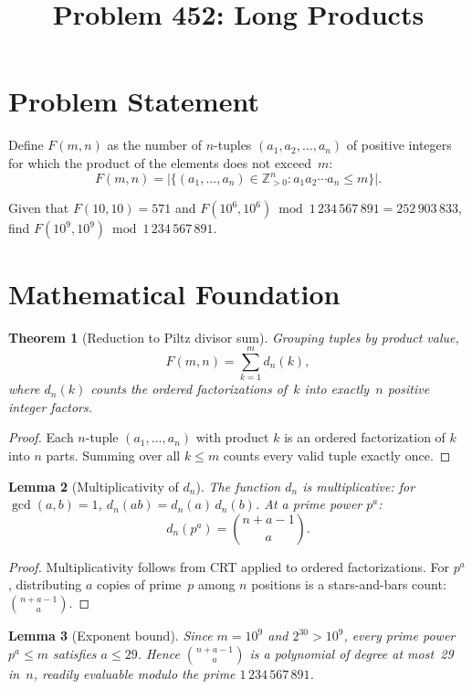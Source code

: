 \documentclass[12pt,a4paper]{article}
\title{Problem 452: Long Products}
\author{}
\date{}
\newtheorem{theorem}{Theorem}
\newtheorem{lemma}[theorem]{Lemma}
\newcommand{\Fmn}{F(m,n)}
\newcommand{\dn}{d_n}
\newcommand{\MOD}{1\,234\,567\,891}
\begin{document}
\maketitle

\section{Problem Statement}

Define $\Fmn$ as the number of $n$-tuples $(a_1, a_2, \ldots, a_n)$ of positive
integers for which the product of the elements does not exceed~$m$:
\[
  \Fmn = \bigl|\bigl\{(a_1, \ldots, a_n) \in \mathbb{Z}_{>0}^n : a_1 a_2 \cdots a_n \le m\bigr\}\bigr|.
\]

Given that $F(10, 10) = 571$ and $F(10^6, 10^6) \bmod \MOD = 252\,903\,833$,
find $F(10^9, 10^9) \bmod \MOD$.

\section{Mathematical Foundation}

\begin{theorem}[Reduction to Piltz divisor sum]\label{thm:piltz}
Grouping tuples by product value,
\[
  \Fmn = \sum_{k=1}^{m} \dn(k),
\]
where $\dn(k)$ counts the ordered factorizations of~$k$ into exactly~$n$ positive integer factors.
\end{theorem}

\begin{proof}
Each $n$-tuple $(a_1, \ldots, a_n)$ with product $k$ is an ordered factorization of $k$ into $n$ parts. Summing over all $k \le m$ counts every valid tuple exactly once.
\end{proof}

\begin{lemma}[Multiplicativity of $\dn$]\label{lem:mult}
The function $\dn$ is multiplicative: for $\gcd(a,b) = 1$,
$\dn(ab) = \dn(a)\,\dn(b)$. At a prime power $p^a$:
\[
  \dn(p^a) = \binom{n + a - 1}{a}.
\]
\end{lemma}

\begin{proof}
Multiplicativity follows from CRT applied to ordered factorizations. For $p^a$, distributing $a$ copies of prime~$p$ among $n$ positions is a stars-and-bars count: $\binom{n+a-1}{a}$.
\end{proof}

\begin{lemma}[Exponent bound]\label{lem:exp}
Since $m = 10^9$ and $2^{30} > 10^9$, every prime power $p^a \le m$ satisfies $a \le 29$. Hence $\binom{n+a-1}{a}$ is a polynomial of degree at most~29 in~$n$, readily evaluable modulo the prime $\MOD$.
\end{lemma}
\end{document}
